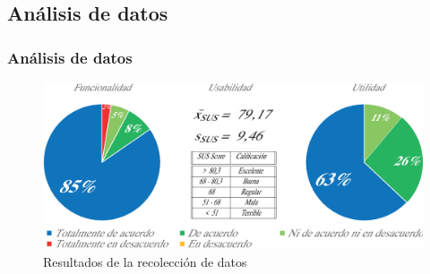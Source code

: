 \documentclass[9pt]{beamer}
\begin{document}
    \subsection{Análisis de datos}
    \begin{frame}      
        \frametitle{Análisis de datos}
        \begin{figure}
            \centering
            \includegraphics[width=\textwidth]{assets/Evaluacion/resultadosv2.eps}
            \caption{Resultados de la recolección de datos}
        \end{figure}
    \end{frame}

    
\end{document}

